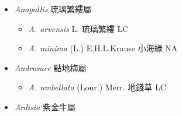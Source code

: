 
  \begin{itemize}
 \item[] \textit{Anagallis} 琉璃繁縷屬
                                
  \begin{itemize}
        \item[] \textit{A. arvensis} L.  琉璃繁縷   LC
        \item[] \textit{A. minima} (L.) E.H.L.Krause  小海綠   NA
  \end{itemize}
 \item[] \textit{Androsace} 點地梅屬
                                
  \begin{itemize}
        \item[] \textit{A. umbellata} (Lour.) Merr.  地錢草   LC
  \end{itemize}
 \item[] \textit{Ardisia} 紫金牛屬
                                

\end{itemize}
